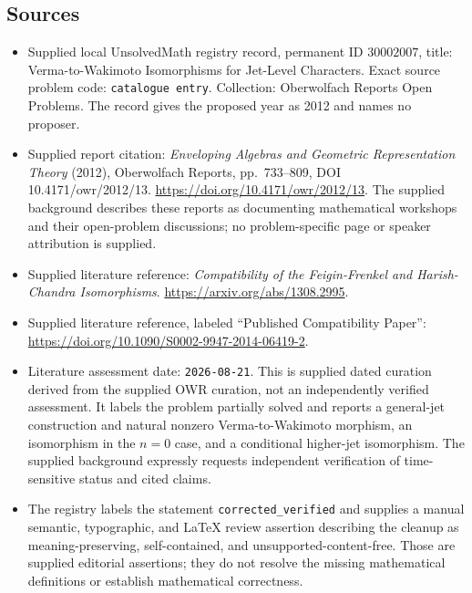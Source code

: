 \documentclass[11pt]{article}
\begin{document}
\subsection{Sources}
\begin{itemize}
\item Supplied local UnsolvedMath registry record, permanent ID \(30002007\), title: Verma-to-Wakimoto Isomorphisms for Jet-Level Characters. Exact source problem code: \texttt{catalogue entry}. Collection: Oberwolfach Reports Open Problems. The record gives the proposed year as 2012 and names no proposer.
\item Supplied report citation: \emph{Enveloping Algebras and Geometric Representation Theory} (2012), Oberwolfach Reports, pp.\ 733--809, DOI 10.4171/owr/2012/13. \url{https://doi.org/10.4171/owr/2012/13}. The supplied background describes these reports as documenting mathematical workshops and their open-problem discussions; no problem-specific page or speaker attribution is supplied.
\item Supplied literature reference: \emph{Compatibility of the Feigin-Frenkel and Harish-Chandra Isomorphisms}. \url{https://arxiv.org/abs/1308.2995}.
\item Supplied literature reference, labeled ``Published Compatibility Paper'': \url{https://doi.org/10.1090/S0002-9947-2014-06419-2}.
\item Literature assessment date: \texttt{2026-08-21}. This is supplied dated curation derived from the supplied OWR curation, not an independently verified assessment. It labels the problem partially solved and reports a general-jet construction and natural nonzero Verma-to-Wakimoto morphism, an isomorphism in the \(n=0\) case, and a conditional higher-jet isomorphism. The supplied background expressly requests independent verification of time-sensitive status and cited claims.
\item The registry labels the statement \texttt{corrected\_verified} and supplies a manual semantic, typographic, and LaTeX review assertion describing the cleanup as meaning-preserving, self-contained, and unsupported-content-free. Those are supplied editorial assertions; they do not resolve the missing mathematical definitions or establish mathematical correctness.
\end{itemize}
\end{document}
